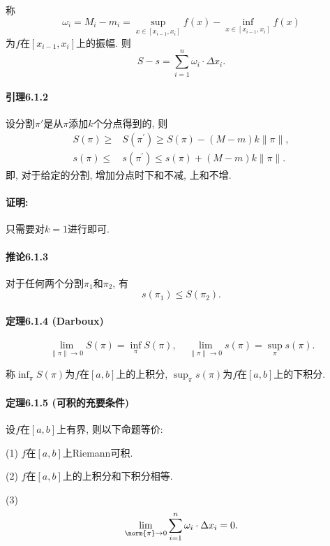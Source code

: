 称
\[
\omega_{i}=M_{i}-m_{i}=\sup_{x\in\left[x_{i-1},x_{i}\right]}f(x)-\inf_{x\in\left[x_{i-1},x_{i}\right]}f(x)
\]
为$f$在$[x_{i-1},x_{i}]$上的振幅. 则
\[
S-s=\sum_{i=1}^{n}\omega_{i}\cdot\Delta x_{i}.
\]


\paragraph{引理6.1.2}

设分割$\pi'$是从$\pi$添加$k$个分点得到的, 则
\[
\begin{aligned}S(\pi)\geqslant & S\left(\pi^{\prime}\right)\geqslant S(\pi)-(M-m)k\|\pi\|,\\
s(\pi)\leqslant & s\left(\pi^{\prime}\right)\leqslant s(\pi)+(M-m)k\|\pi\|.
\end{aligned}
\]
即, 对于给定的分割, 增加分点时下和不减, 上和不增.

\paragraph{证明:}

只需要对$k=1$进行即可.

\paragraph{推论6.1.3}

对于任何两个分割$\pi_{1}$和$\pi_{2}$, 有
\[
s(\pi_{1})\le S(\pi_{2}).
\]


\paragraph{定理6.1.4 (Darboux)}

\[
\lim_{\|\pi\|\rightarrow0}S(\pi)=\inf_{\pi}S(\pi),\quad\lim_{\|\pi\|\rightarrow0}s(\pi)=\sup_{\pi}s(\pi).
\]

称$\inf_{\pi}S(\pi)$为$f$在$[a,b]$上的上积分, $\sup_{\pi}s(\pi)$为$f$在$[a,b]$上的下积分.

\paragraph{定理6.1.5 (可积的充要条件)}

设$f$在$[a,b]$上有界, 则以下命题等价:

(1) $f$在$[a,b]$上Riemann可积.

(2) $f$在$[a,b]$上的上积分和下积分相等.

(3) 
\[
\lim_{\norm{\pi}\to0}\sum_{i=1}^{n}\omega_{i}\cdot\Delta x_{i}=0.
\]

